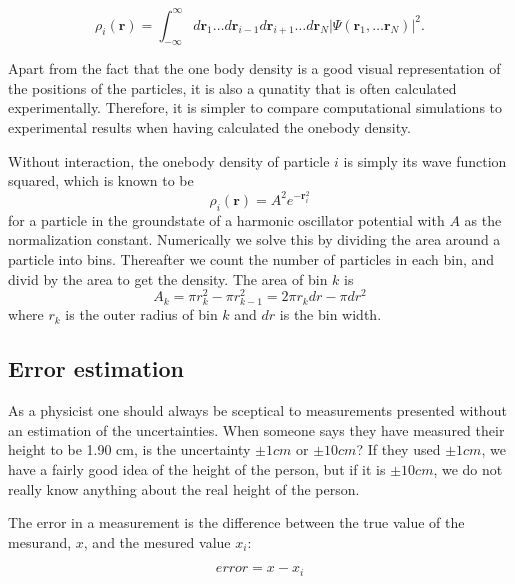 \documentclass[norsk,a4paper,12pt]{article}
\begin{document}
\begin{equation}
\label{eq:onebody_density}
\rho_i(\boldsymbol{r})=\int_{-\infty}^{\infty}d\boldsymbol{r}_1\hdots d\boldsymbol{r}_{i-1}d\boldsymbol{r}_{i+1}\hdots d\boldsymbol{r}_N |\Psi(\boldsymbol{r}_1,\hdots \boldsymbol{r}_N)|^2.
\end{equation}

Apart from the fact that the one body density is a good visual representation of the positions of the particles, it is also a qunatity that is often calculated experimentally. Therefore, it is simpler to compare computational simulations to  experimental results when having calculated the onebody density.

Without interaction, the onebody density of particle $i$ is simply its wave function squared, which is known to be
\begin{equation}
\rho_i(\boldsymbol{r})=A^2e^{-\boldsymbol{r}_i^2}
\end{equation}
for a particle in the groundstate of a harmonic oscillator potential with $A$ as the normalization constant. Numerically we solve this by dividing the area around a particle into bins. Thereafter we count the number of particles in each bin, and divid by the area to get the density. The area of bin $k$ is
\begin{equation}
A_k=\pi r_k^2-\pi r_{k-1}^2=2\pi r_kdr-\pi dr^2
\end{equation}
where $r_k$ is the outer radius of bin $k$ and $dr$ is the bin width.

\subsection{Error estimation} \label{sec:error_estimation}
As a physicist one should always be sceptical to measurements presented without an estimation of the uncertainties. When someone says they have measured their height to be 1.90 cm, is the uncertainty $\pm 1 cm$ or $\pm 10 cm$? If they used $\pm 1 cm$, we have a fairly good idea of the height of the person, but if it is $\pm 10 cm$, we do not really know anything about the real height of the person. 
\par 
\vspace{3mm}
The error in a measurement is the difference between the true value of the mesurand, $x$, and the mesured value $x_i$:

\begin{equation}
	error = x - x_i
\end{equation}
\end{document}

